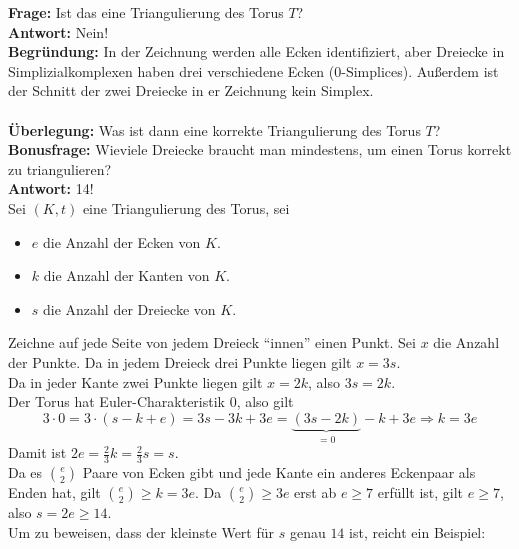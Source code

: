 \begin{problem*}[1]

  \textbf{Frage:} Ist das eine Triangulierung des Torus \( T \)? \\
  \textbf{Antwort:} Nein! \\
  \textbf{Begründung:} In der Zeichnung werden alle Ecken identifiziert, aber Dreiecke in Simplizialkomplexen haben drei verschiedene Ecken (0-Simplices). Außerdem ist der Schnitt der zwei Dreiecke in er Zeichnung kein Simplex. \\
  \\
  \textbf{Überlegung:} Was ist dann eine korrekte Triangulierung des Torus \( T \)? \\

  \textbf{Bonusfrage:} Wieviele Dreiecke braucht man mindestens, um einen Torus korrekt zu triangulieren? \\
  \textbf{Antwort:} 14! \\
  Sei \( (K,t) \) eine Triangulierung des Torus, sei 
  \begin{itemize}
    \item \( e \) die Anzahl der Ecken von \( K \).
    \item \( k \) die Anzahl der Kanten von \( K \).
    \item \( s \) die Anzahl der Dreiecke von \( K \).
  \end{itemize} 
  Zeichne auf jede Seite von jedem Dreieck ``innen'' einen Punkt. Sei \( x \) die Anzahl der Punkte.
  Da in jedem Dreieck drei Punkte liegen gilt \( x = 3s \). \\
  Da in jeder Kante zwei Punkte liegen gilt \( x = 2k \), also \( 3s = 2k \). \\
  Der Torus hat Euler-Charakteristik \( 0 \), also gilt
  \begin{equation*}
    3 \cdot 0 = 3 \cdot (s - k + e) = 3s - 3k +3e = \underbrace{(3s -2k)}_{= 0} - k + 3e \Rightarrow k = 3e
  \end{equation*}
  Damit ist \( 2e = \frac{2}{3} k = \frac{2}{3} s = s \). \\

  Da es \( \binom{e}{2} \) Paare von Ecken gibt und jede Kante ein anderes Eckenpaar als Enden hat, gilt  \( \binom{e}{2} \geq k = 3e \). Da \( \binom{e}{2} \geq 3e \) erst ab \( e \geq 7 \) erfüllt ist, gilt \( e \geq 7 \), also \( s = 2e \geq 14 \). \\
  Um zu beweisen, dass der kleinste Wert für \( s \) genau \( 14 \) ist, reicht ein Beispiel: 

\end{problem*}
